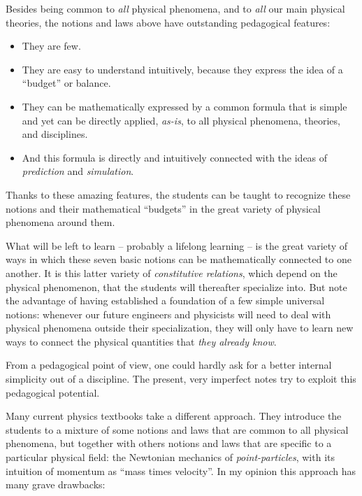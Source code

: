\documentclass[a4paper,12pt,%
onecolumn,oneside,%
british%
]{memoir}
\renewcommand*{\|}[1][]{\nonscript\:#1\vert\nonscript\:\mathopen{}}
\begin{document}
Besides being common to \emph{all} physical phenomena, and to \emph{all} our main physical theories, the notions and laws above have outstanding pedagogical features:
\begin{itemize}
\item They are few.
\item They are easy to understand intuitively, because they express the idea of a \enquote{budget} or balance.
\item They can be mathematically expressed by a common formula that is simple and yet can be directly applied, \emph{as-is}, to all physical phenomena, theories, and disciplines.
\item And this formula is directly and intuitively connected with the ideas of \emph{prediction} and \emph{simulation}.
\end{itemize}
Thanks to these amazing features, the students can be taught to recognize these notions and their mathematical \enquote{budgets} in the great variety of physical phenomena around them.

What will be left to learn -- probably a lifelong learning -- is the great variety of ways in which these seven basic notions can be mathematically connected to one another. It is this latter variety of \emph{constitutive relations}, which depend on the physical phenomenon, that the students will thereafter specialize into. But note the advantage of having established a foundation of a few simple universal notions: whenever our future engineers and physicists will need to deal with physical phenomena outside their specialization, they will only have to learn new ways to connect the physical quantities that \emph{they already know}.

From a pedagogical point of view, one could hardly ask for a better internal simplicity out of a discipline. The present, very imperfect notes try to exploit this pedagogical potential.

\bigskip

Many current physics textbooks take a different approach. They introduce the students to a mixture of some notions and laws that are common to all physical phenomena, but together with others notions and laws that are specific to a particular physical field: the Newtonian mechanics of \emph{point-particles}, with its intuition of momentum as \enquote{mass times velocity}. In my opinion this approach has many grave drawbacks:
\end{document}
